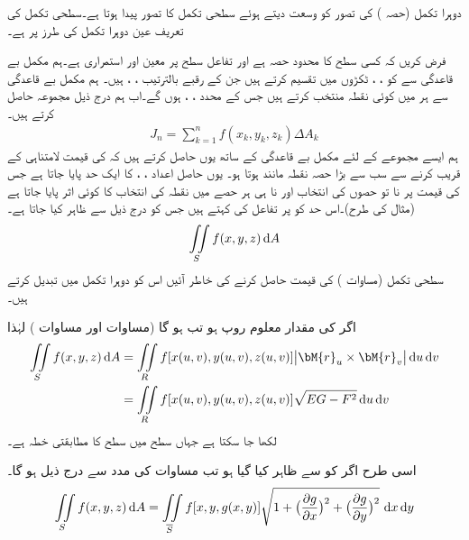 دوہرا تکمل (حصہ ) کی تصور کو وسعت دیتے ہوئے سطحی تکمل کا تصور پیدا ہوتا ہے۔سطحی تکمل کی تعریف عین دوہرا تکمل کی طرز پر ہے۔

فرض کریں کہ  کسی سطح کا محدود حصہ ہے اور تفاعل  سطح  پر معین اور استمراری ہے۔ہم مکمل بے قاعدگی سے  کو ، ،  ٹکڑوں میں تقسیم کرتے ہیں جن کے  رقبے بالترتیب  ، ،  ہیں۔ ہم مکمل بے قاعدگی سے ہر  میں کوئی نقطہ   منتخب کرتے ہیں جس کے محدد ، ،  ہوں گے۔اب ہم درج ذیل مجموعہ حاصل کرتے ہیں۔
\begin{align}\label{مساوات_خطی_تکمل_سطحی_تکمل_الف}
J_n=\sum_{k=1}^{n}f(x_k,y_k,z_k)\Delta A_k
\end{align}
ہم ایسے مجموعے  کے لئے مکمل بے قاعدگی کے ساتھ یوں حاصل کرتے ہیں کہ  کی قیمت لامتناہی کے قریب کرنے سے سب سے بڑا حصہ  نقطہ مانند ہوتا ہو۔ یوں حاصل اعداد ، ،  کا ایک حد پایا جاتا ہے جس کی قیمت پر نا تو حصوں کی انتخاب اور نا ہی ہر حصے میں نقطہ کی انتخاب کا کوئی اثر پایا جاتا ہے (مثال  کی طرح)۔اس حد کو  پر تفاعل  کی  کہتے ہیں جس کو درج ذیل سے ظاہر کیا جاتا ہے۔
\begin{align}\label{مساوات_خطی_تکمل_سطحی_تکمل_ب}
\iint\limits_S f(x,y,z)\dif A
\end{align}
سطحی تکمل (مساوات ) کی قیمت حاصل کرنے کی خاطر آئیں اس کو دوہرا تکمل میں تبدیل کرتے ہیں۔

اگر  کی مقدار معلوم روپ  ہو تب  ہو گا (مساوات  اور مساوات ) لہٰذا
\begin{gather}
\begin{aligned}\label{مساوات_خطی_تکمل_سطحی_تکمل_بطور_دوہرا_الف}
\iint\limits_S f(x,y,z)\dif A&=\iint\limits_R f[x(u,v),y(u,v),z(u,v)] \abs{\bM{r}_u\times \bM{r}_v}\dif u\dif v\\
&=\iint\limits_R f[x(u,v),y(u,v),z(u,v)] \sqrt{EG-F^2}\dif u\dif v 
\end{aligned}
\end{gather}
لکھا جا سکتا ہے جہاں  سطح میں  سطح  کا مطابقتی خطہ ہے۔ 

اسی طرح اگر  کو  سے ظاہر کیا گیا ہو تب مساوات  کی مدد سے درج ذیل ہو گا۔
\begin{align}\label{مساوات_خطی_تکمل_سطحی_تکمل_بطور_دوہرا_ب}
\iint\limits_S f(x,y,z)\dif A=\iint\limits_{\overline{S}} f[x,y,g(x,y)]\sqrt{1+\big(\frac{\partial g}{\partial x}\big)^2+\big(\frac{\partial g}{\partial y}\big)^2}\,\dif x\dif y
\end{align}

